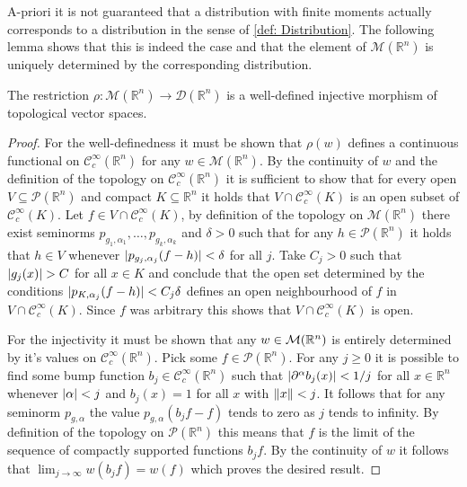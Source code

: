 A-priori it is not guaranteed that a distribution with finite moments actually corresponds to a distribution in the sense of \cref{def: Distribution}.
The following lemma shows that this is indeed the case and that the element of $\mathcal{M}(\mathbb{R}^n)$ is uniquely determined by the corresponding distribution.
\begin{lemma}
  The restriction $\rho: \mathcal{M}(\mathbb{R}^n)\to \mathcal{D}(\mathbb{R}^n)$
  is a well-defined injective morphism of topological vector spaces.
\end{lemma}
\begin{proof}
   For the well-definedness it must be shown that $\rho(w)$ defines a continuous functional on $\mathcal{C}_c^\infty(\mathbb{R}^n)$ for any $w\in \mathcal{M}(\mathbb{R}^n)$.
   By the continuity of $w$ and the definition of the topology on $\mathcal{C}_c^\infty(\mathbb{R}^n)$ it is sufficient to show that for every open $V\subseteq \mathcal{P}(\mathbb{R}^n)$ and compact $K\subseteq \mathbb{R}^n$ it holds that $V\cap \mathcal{C}_c^\infty(K)$ is an open subset of $\mathcal{C}_c^\infty(K)$.
   Let $f\in V\cap \mathcal{C}_c^\infty(K)$, by definition of the topology on $\mathcal{M}(\mathbb{R}^n)$ there exist seminorms $p_{g_1,\alpha_1},\ldots,p_{g_k,\alpha_k}$ and $\delta >0$ such that for any $h\in\mathcal{P}(\mathbb{R}^n)$ it holds that $h\in V$ whenever $\vert p_{g_j,\alpha_j}(f-h) \vert<\delta$ for all $j$.
   Take $C_j>0$ such that $\vert g_j(x) \vert>C$ for all $x\in K$ and conclude that the open set determined by the conditions $\vert p_{K,\alpha_j}(f-h) \vert<C_j\delta$ defines an open neighbourhood of $f$ in $V\cap\mathcal{C}_c^\infty(K)$.
   Since $f$ was arbitrary this shows that $V\cap\mathcal{C}_c^\infty(K)$ is open.

   For the injectivity it must be shown that any $w\in \mathcal{M}(\mathbb{R}^n)$ is entirely determined by it's values on $\mathcal{C}_c^\infty(\mathbb{R}^n)$.
   Pick some $f\in \mathcal{P}(\mathbb{R}^n)$.
   For any $j\geq 0$ it is possible to find some bump function $b_j\in \mathcal{C}_c^\infty(\mathbb{R}^n)$ such that $\vert \partial^\alpha b_j(x) \vert<1/j$ for all $x\in\mathbb{R}^n$ whenever $\vert \alpha \vert <j$ and $b_j(x) = 1$ for all $x$ with $\Vert x \Vert<j$.
   It follows that for any seminorm $p_{g,\alpha}$ the value $p_{g,\alpha}(b_jf - f)$ tends to zero as $j$ tends to infinity.
   By definition of the topology on $\mathcal{P}(\mathbb{R}^n)$ this means that $f$ is the limit of the sequence of compactly supported functions $b_jf$.
   By the continuity of $w$ it follows that $\lim_{j\to \infty} w(b_jf) = w(f)$ which proves the desired result.


\end{proof}
